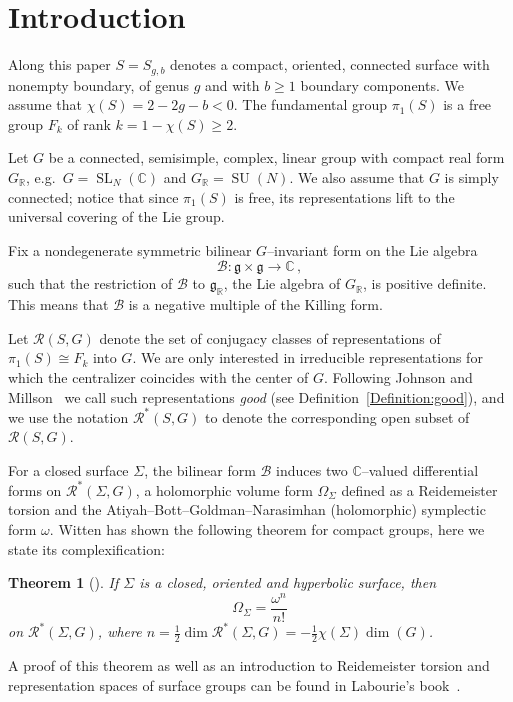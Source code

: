 \documentclass[11pt]{article}
\newtheorem{theo}{Theorem}[section]
\theoremstyle{definition}
\numberwithin{equation}{section}
\numberwithin{figure}{section}
\numberwithin{table}{section}
\DeclareMathOperator{\SL}{SL}
\DeclareMathOperator{\SU}{SU}
\newcommand{\Bcal}{\mathcal{B}}
\newcommand{\Rcal}{\mathcal{R}}
\newcommand{\Cbb}{\mathbb{C}}
\newcommand{\Rbb}{\mathbb {R}}
\newcommand{\gfrk}{\mathfrak{g}}
\newcommand{\SUn}{\SU(N)}
\newcommand*\bS{b}
\newcommand*\Rg{\Rcal^*}
\begin{document}
\section{Introduction}\label{sec:intro}

Along this paper $S=S_{g,\bS}$ denotes a compact, oriented, connected surface with nonempty boundary, of genus $g$ and with $\bS\geq 1$ boundary components. We assume that $\chi(S)=2-2g-\bS<0$. The fundamental group $\pi_1(S)$ is a free group $F_k$ of rank $k=1-\chi(S)\geq 2$.

Let $G$ be a connected, semisimple, complex, linear group with compact real form $G_\Rbb$, e.g.~$G=\SL_N (\Cbb)$ and $G_\Rbb=\SUn$. We also assume that $G$ is simply connected; notice that since $\pi_1(S)$ is free, its representations lift to the universal covering of the Lie group.



Fix a nondegenerate symmetric bilinear $G$--invariant form on the Lie algebra
\[
\Bcal\colon \gfrk\times \gfrk \to \Cbb\,,
\]
such that the restriction of $\Bcal$ to $\gfrk_\Rbb$, the Lie algebra of $G_\Rbb$, is positive definite. This means that $\Bcal$ is a negative multiple of the Killing form.

Let $\Rcal(S,G)$ denote the set of conjugacy classes of representations of $\pi_1(S)\cong F_k$ into $G$. We are only interested in irreducible representations for which the centralizer coincides with the center of $G$. Following Johnson and Millson~\cite{JohnsonMillson} we call such representations \emph{good} (see Definition~\ref{Definition:good}), and we use the notation $\Rg(S,G)$ to denote the corresponding open subset of $\Rcal(S,G)$.



For a closed surface $\Sigma$, the bilinear form $\Bcal$ induces two $\Cbb$--valued differential forms on $ \Rg(\Sigma,G)$, a holomorphic volume form $\Omega_\Sigma$ defined as a Reidemeister torsion and the Atiyah--Bott--Goldman--Narasimhan (holomorphic) symplectic form $\omega$. Witten has shown the following theorem for compact groups, here we state its complexification:

\begin{theo}[{\cite[Witten]{Witten}}]\label{Theorem:Witten}
If $\Sigma$ is a closed, oriented and hyperbolic surface, then
\[
\Omega_\Sigma=\frac{\omega^{n}}{n!}
\]
on $\Rg(\Sigma,G)$, where $n=\frac12\dim \Rg(\Sigma,G)=-\frac12\chi(\Sigma)\dim(G)$.
\end{theo}

A proof of this theorem as well as an introduction to Reidemeister torsion and representation spaces of surface groups can be found in Labourie's book~\cite{LabourieSG}.
\end{document}
